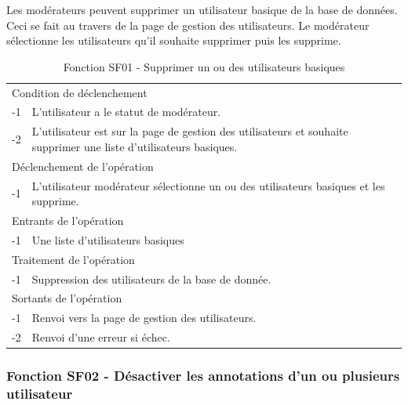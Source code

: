\documentclass[a4paper]{article}
\begin{document}
Les modérateurs peuvent supprimer un utilisateur basique de la base de données. Ceci se fait au travers de la page de gestion des utilisateurs. Le modérateur sélectionne les utilisateurs qu'il souhaite supprimer puis les supprime.

\begin{table}[H]
  \centering
   \small
	\begin{tabular}{|c|p{12cm}|}
   		\hline
   			\rowcolor{lightgray}\multicolumn{2}{|c|}{\textbf{Fonction SF01 - Supprimer un ou des utilisateurs}} \\
   		\hline
   			\multicolumn{2}{|l|}{Condition de déclenchement} \\
   		\hline
   			-1 & L'utilisateur a le statut de modérateur.\\
        			-2 & L'utilisateur est sur la page de gestion des utilisateurs et souhaite supprimer une liste d'utilisateurs basiques.\\
        
   		\hline
   			\multicolumn{2}{|l|}{Déclenchement de l'opération} \\
   		\hline
   			-1 & L'utilisateur modérateur sélectionne un ou des utilisateurs basiques et les supprime.\\
   		\hline
   			\multicolumn{2}{|l|}{Entrants de l'opération} \\
   		\hline
   			-1 & Une liste d'utilisateurs basiques\\
   		\hline
   			\multicolumn{2}{|l|}{Traitement de l'opération} \\
  		\hline
   			-1 & Suppression des utilisateurs de la base de donnée.\\
   		\hline
   			\multicolumn{2}{|l|}{Sortants de l'opération} \\
   		\hline
   			-1 & Renvoi vers la page de gestion des utilisateurs.\\
        			-2 & Renvoi d'une erreur si échec.\\ 
   		\hline
	\end{tabular}
  \caption{Fonction SF01 - Supprimer un ou des utilisateurs basiques}
  \normalsize
  \label{tab: supprimmer_utilisateur_basique}
\end{table}


\subsubsection{Fonction SF02 - Désactiver les annotations d'un ou plusieurs utilisateur}
\end{document}
